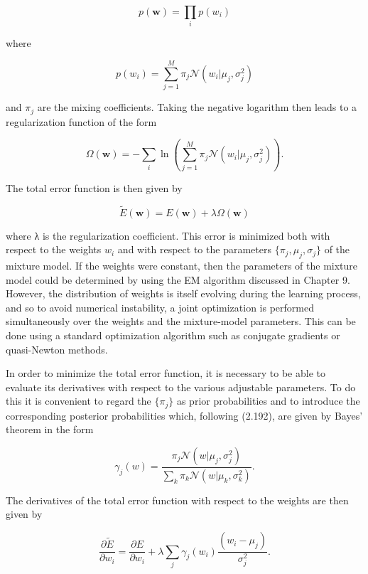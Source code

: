 \documentclass[
  10
]{article}
\begin{document}
\[
p (\mathbf {w}) = \prod_ {i} p (w _ {i})\tag{5.136}
\]

where

\[
p (w _ {i}) = \sum_ {j = 1} ^ {M} \pi_ {j} \mathcal {N} (w _ {i} | \mu_ {j}, \sigma_ {j} ^ {2})\tag{5.137}
\]

and \(\pi _ { j }\) are the mixing coefficients. Taking the negative
logarithm then leads to a regularization function of the form

\[
\Omega (\mathbf {w}) = - \sum_ {i} \ln \left(\sum_ {j = 1} ^ {M} \pi_ {j} \mathcal {N} (w _ {i} | \mu_ {j}, \sigma_ {j} ^ {2})\right).\tag{5.138}
\]

The total error function is then given by

\[
\widetilde {E} (\mathbf {w}) = E (\mathbf {w}) + \lambda \Omega (\mathbf {w})\tag{5.139}
\]

where λ is the regularization coefficient. This error is minimized both
with respect to the weights \(w _ { i }\) and with respect to the
parameters \(\{ \pi _ { j } , \mu _ { j } , \sigma _ { j } \}\) of the
mixture model. If the weights were constant, then the parameters of the
mixture model could be determined by using the EM algorithm discussed in
Chapter 9. However, the distribution of weights is itself evolving
during the learning process, and so to avoid numerical instability, a
joint optimization is performed simultaneously over the weights and the
mixture-model parameters. This can be done using a standard optimization
algorithm such as conjugate gradients or quasi-Newton methods.

In order to minimize the total error function, it is necessary to be
able to evaluate its derivatives with respect to the various adjustable
parameters. To do this it is convenient to regard the
\(\{ \pi _ { j } \}\) as prior probabilities and to introduce the
corresponding posterior probabilities which, following (2.192), are
given by Bayes' theorem in the form

\[
\gamma_ {j} (w) = \frac {\pi_ {j} \mathcal {N} (w | \mu_ {j} , \sigma_ {j} ^ {2})}{\sum_ {k} \pi_ {k} \mathcal {N} (w | \mu_ {k} , \sigma_ {k} ^ {2})}.\tag{5.140}
\]

The derivatives of the total error function with respect to the weights
are then given by

\[
\frac {\partial \widetilde {E}}{\partial w _ {i}} = \frac {\partial E}{\partial w _ {i}} + \lambda \sum_ {j} \gamma_ {j} (w _ {i}) \frac {(w _ {i} - \mu_ {j})}{\sigma_ {j} ^ {2}}.\tag{5.141}
\]
\end{document}
